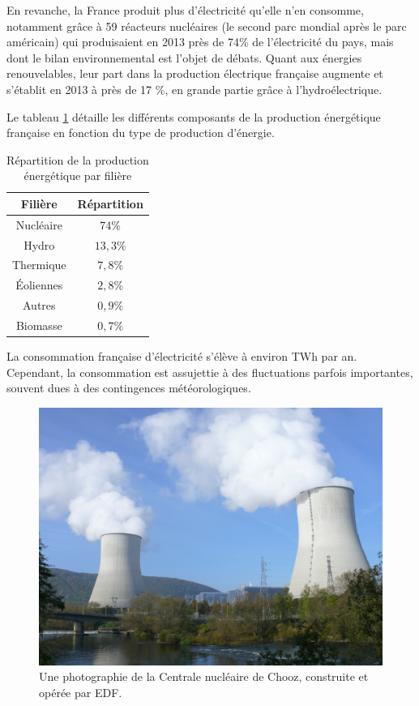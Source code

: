 \documentclass[12pt,a4paper,oneside,openany]{memoir}
\begin{document}
En revanche, la France produit plus d’électricité qu’elle n’en consomme, notamment grâce à 59 réacteurs nucléaires (le second parc mondial après le parc américain) qui produisaient en 2013 près de 74\% de l’électricité du pays, mais dont le bilan environnemental est l’objet de débats. Quant aux énergies renouvelables, leur part dans la production électrique française augmente et s’établit en 2013 à près de 17 \%, en grande partie grâce à l’hydroélectrique. 

Le tableau \ref{repartition production} détaille les différents composants de la production énergétique française en fonction du type de production d'énergie.

	\begin{table}[h]
		\centering
		\begin{tabular}{cc}
			\toprule
			Filière & Répartition\\
			\midrule
			Nucléaire & $74\%$ \\ 
			Hydro & $13,3\%$ \\ 
			Thermique & $7,8\%$ \\ 
			Éoliennes & $2,8\%$ \\ 
			Autres & $0,9\%$ \\ 
			Biomasse & $0,7\%$ \\ 
			\bottomrule
		\end{tabular} 
		\caption{Répartition de la production énergétique par filière}
		\label{repartition production}
	\end{table}


La consommation française d'électricité s'élève à environ \unit[480]{TWh} par an. Cependant, la consommation est assujettie à des fluctuations parfois importantes, souvent dues à des contingences météorologiques. 

\begin{figure}[h]
	\includegraphics[width=\textwidth]{img/centrale1.jpeg}
	\caption[Une photographie de la Centrale nucléaire de Chooz]{Une photographie de la Centrale nucléaire de Chooz, construite et opérée par EDF.}
\end{figure}
\end{document}

